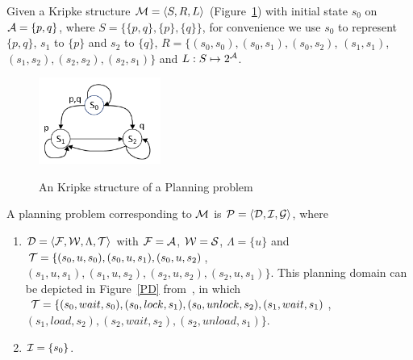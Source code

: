 \documentclass[letterpaper]{article} %
\begin{document}
 \begin{example}
Given a Kripke structure  ${\cal M} = {\langle{S, R, L}\rangle}$ (Figure~\ref{PB_Kripke}) with initial state $s_0$ on ${\cal A}=\{p,q\}$, where $S = \{\{p, q\}, \{p\}, \{q\}\}$, for convenience we use $s_0$ to represent $\{p, q\}$, $s_1$ to $\{p\}$ and $s_2$ to $\{q\}$, $R=\{(s_0, s_0), (s_0, s_1), (s_0, s_2)$, $(s_1, s_1)$, $(s_1, s_2),(s_2, s_2), (s_2, s_1)\}$ and $L:S \mapsto 2^{\cal A}$.


\begin{figure}[ht]
  \centering
  \includegraphics[width=4cm]{PB_Kripke.png}\\
  \caption{An Kripke structure of a Planning problem}\label{PB_Kripke}
\end{figure}

A  planning problem corresponding  to ${\cal M}$ is $\cal P= {\langle{\cal D, \cal I, \cal G}\rangle}$, where 
\begin{enumerate}[.]
  \item ${\cal D} ={\langle{{\cal F}, {\cal W}, \Lambda, \cal T}\rangle}$ with $\cal F = \cal A$, $\cal W = S$, $\Lambda = \{u\}$ and ${\cal T}=\{(s_0, u, s_0), (s_0, u, s_1), (s_0, u, s_2)$, $(s_1, u, s_1), (s_1, u, s_2),(s_2, u, s_2), (s_2, u, s_1)\}$. This planning domain can be depicted in Figure~\ref{PD} from~\cite{akintunde2017planning}, in which ${\cal T}=\{(s_0, wait, s_0), (s_0, lock, s_1), (s_0, unlock, s_2), (s_1, wait, s_1)$, $(s_1, load, s_2),(s_2, wait, s_2), (s_2, unload, s_1)\}$.
  \item ${\cal I}=\{s_0\}$.
\end{enumerate}



\end{example}
\end{document}
